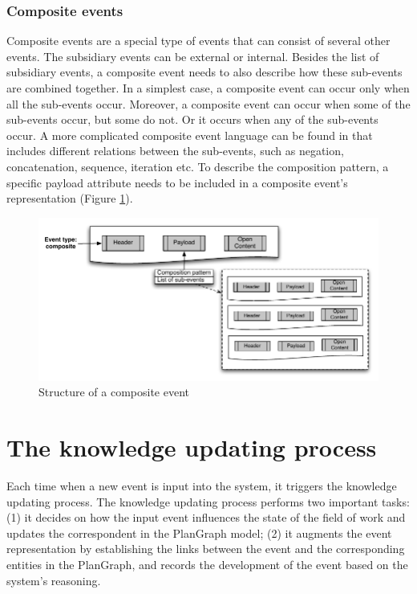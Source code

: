 \subsubsection{Composite events} %
\label{ssub:composite_events}
Composite events are a special type of events that can consist of several other events. The subsidiary events can be external or internal. Besides the list of subsidiary events, a composite event needs to also describe how these sub-events are combined together. In a simplest case, a composite event can occur only when all the sub-events occur. Moreover, a composite event can occur when some of the sub-events occur, but some do not. Or it occurs when any of the sub-events occur. A more complicated composite event language can be found in \cite{Mhl2010} that includes different relations between the sub-events, such as negation, concatenation, sequence, iteration etc. To describe the composition pattern, a specific payload attribute needs to be included in a composite event's representation (Figure \ref{fig:composite_event}).
\begin{figure}[htbp] %
	\centering
	\includegraphics{composite_event.pdf} 
	\caption{Structure of a composite event}
	\label{fig:composite_event}
\end{figure}

\section{The knowledge updating process} %
\label{sec:knowledge_updating_process}
Each time when a new event is input into the system, it triggers the knowledge updating process. The knowledge updating process performs two important tasks: (1) it decides on how the input event influences the state of the field of work and updates the correspondent in the PlanGraph model; (2) it augments the event representation by establishing the links between the event and the corresponding entities in the PlanGraph, and records the development of the event based on the system's reasoning.

